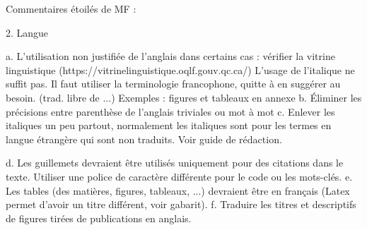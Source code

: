 Commentaires étoilés de MF :






2. Langue

a. L’utilisation non justifiée de l’anglais dans certains cas : vérifier la vitrine linguistique (https://vitrinelinguistique.oqlf.gouv.qc.ca/) L'usage de l'italique ne suffit pas. Il faut utiliser la terminologie francophone, quitte à en suggérer au besoin. (trad. libre de ...) Exemples : figures et tableaux en annexe
b. Éliminer les précisions entre parenthèse de l'anglais triviales ou mot à mot
c. Enlever les italiques un peu partout, normalement les italiques sont pour les termes en langue étrangère qui sont non traduits. Voir guide de rédaction.

d. Les guillemets devraient être utilisés uniquement pour des citations dans le texte. Utiliser une police de caractère différente pour le code ou les mots-clés.
e. Les tables (des matières, figures, tableaux, ...) devraient être en français (Latex permet d'avoir un titre différent, voir gabarit).
f. Traduire les titres et descriptifs de figures tirées de publications en anglais.

